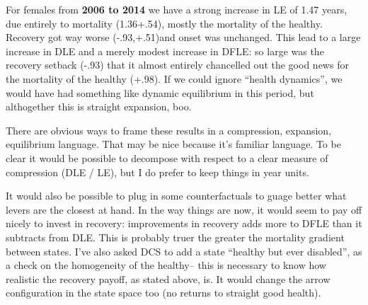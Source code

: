 For females from \textbf{2006 to 2014} we have a strong increase in LE of 1.47 years, due entirely to mortality (1.36+.54), mostly the mortality of the healthy. Recovery got way worse (-.93,+.51)and onset was unchanged. This lead to a large increase in DLE and a merely modest increase in DFLE: so large was the recovery setback (-.93) that it almost entirely chancelled out the good news for the mortality of the healthy (+.98). If we could ignore ``health dynamics'', we would have had something like dynamic equilibrium in this period, but althogether this is straight expansion, boo.

\begin{table}[!ht]
      \caption{Females (all edu)}
      \label{tab:females}
      \centering
{}
     \qquad
{}
\end{table}

There are obvious ways to frame these results in a compression, expansion, equilibrium language. That may be nice because it's familiar language. To be clear it would be possible to decompose with respect to a clear measure of compression (DLE / LE), but I do prefer to keep things in year units.

It would also be possible to plug in some counterfactuals to guage better what levers are the closest at hand. In the way things are now, it would seem to pay off nicely to invest in recovery: improvements in recovery adds more to DFLE than it subtracts from DLE. This is probably truer the greater the mortality gradient between states. I've also asked DCS to add a state ``healthy but ever disabled'', as a check on the homogeneity of the healthy-- this is necessary to know how realistic the recovery payoff, as stated above, is. It would change the arrow configuration in the state space too (no returns to straight good health).
%
%  

